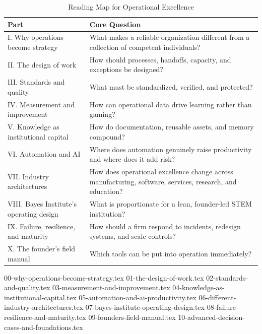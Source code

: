 \begin{table}[t]
\centering
\small
\caption{Reading Map for Operational Excellence}
\label{tab:ch25_reading_map}
\begin{tabularx}{\textwidth}{p{4.2cm} X}
\toprule
\textbf{Part} & \textbf{Core Question} \\
\midrule
I. Why operations become strategy & What makes a reliable organization different from a collection of competent individuals? \\
II. The design of work & How should processes, handoffs, capacity, and exceptions be designed? \\
III. Standards and quality & What must be standardized, verified, and protected? \\
IV. Measurement and improvement & How can operational data drive learning rather than gaming? \\
V. Knowledge as institutional capital & How do documentation, reusable assets, and memory compound? \\
VI. Automation and AI & Where does automation genuinely raise productivity and where does it add risk? \\
VII. Industry architectures & How does operational excellence change across manufacturing, software, services, research, and education? \\
VIII. Bayes Institute's operating design & What is proportionate for a lean, founder-led STEM institution? \\
IX. Failure, resilience, and maturity & How should a firm respond to incidents, redesign systems, and scale controls? \\
X. The founder's field manual & Which tools can be put into operation immediately? \\
\bottomrule
\end{tabularx}
\end{table}

{00-why-operations-become-strategy.tex}
{01-the-design-of-work.tex}
{02-standards-and-quality.tex}
{03-measurement-and-improvement.tex}
{04-knowledge-as-institutional-capital.tex}
{05-automation-and-ai-productivity.tex}
{06-different-industry-architectures.tex}
{07-bayes-institute-operating-design.tex}
{08-failure-resilience-and-maturity.tex}
{09-founders-field-manual.tex}
{10-advanced-decision-cases-and-foundations.tex}
